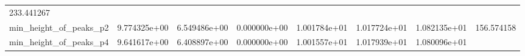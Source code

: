 \documentclass[11pt]{article}
\begin{document}
\begin{longtable}[]{@{}llllllll@{}}
\begin{minipage}[t]{0.08\columnwidth}
233.441267\strut
\end{minipage}\tabularnewline
\begin{minipage}[t]{0.16\columnwidth}\raggedright
min\_height\_of\_peaks\_p2\strut
\end{minipage} & \begin{minipage}[t]{0.09\columnwidth}\raggedright
9.774325e+00\strut
\end{minipage} & \begin{minipage}[t]{0.09\columnwidth}\raggedright
6.549486e+00\strut
\end{minipage} & \begin{minipage}[t]{0.09\columnwidth}\raggedright
0.000000e+00\strut
\end{minipage} & \begin{minipage}[t]{0.09\columnwidth}\raggedright
1.001784e+01\strut
\end{minipage} & \begin{minipage}[t]{0.09\columnwidth}\raggedright
1.017724e+01\strut
\end{minipage} & \begin{minipage}[t]{0.09\columnwidth}\raggedright
1.082135e+01\strut
\end{minipage} & \begin{minipage}[t]{0.08\columnwidth}\raggedright
156.574158\strut
\end{minipage}\tabularnewline
\begin{minipage}[t]{0.16\columnwidth}\raggedright
min\_height\_of\_peaks\_p4\strut
\end{minipage} & \begin{minipage}[t]{0.09\columnwidth}\raggedright
9.641617e+00\strut
\end{minipage} & \begin{minipage}[t]{0.09\columnwidth}\raggedright
6.408897e+00\strut
\end{minipage} & \begin{minipage}[t]{0.09\columnwidth}\raggedright
0.000000e+00\strut
\end{minipage} & \begin{minipage}[t]{0.09\columnwidth}\raggedright
1.001557e+01\strut
\end{minipage} & \begin{minipage}[t]{0.09\columnwidth}\raggedright
1.017939e+01\strut
\end{minipage} & \begin{minipage}[t]{0.09\columnwidth}\raggedright
1.080096e+01\strut
\end{minipage} & \begin{minipage}[t]{0.08\columnwidth}\raggedright

\end{minipage}
\end{longtable}
\end{document}
